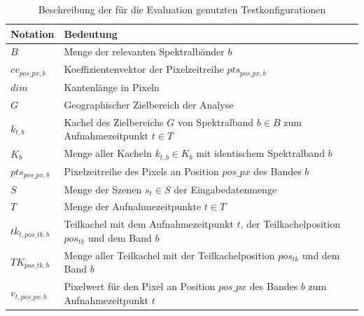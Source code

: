 \begin{table}[h]
          \centering
          \begin{tabular}{| p{2cm} | p{8cm} |}
          	\hline
                  Notation & Bedeutung \\
                  \hline
                  $B$ & Menge der relevanten Spektralbänder $b$ \\
                  \hline
                  $cv_{pos\_px, b}$ & Koeffizientenvektor der Pixelzeitreihe  $pts_{pos\_px, b}$ \\
                  \hline
                  $dim$ & Kantenlänge in Pixeln \\
                  \hline
                  $G$ & Geographischer Zielbereich der Analyse  \\
                  \hline
                  $k_{t, b}$ & Kachel des Zielbereichs $G$ von Spektralband $b \in B$ zum Aufnahmezeitpunkt $t \in T$  \\
                  \hline
                  $K_{b}$ & Menge aller Kacheln $k_{t, b} \in K_b$ mit identischem Spektralband $b$ \\
                  \hline
                  $pts_{pos\_px, b}$ & Pixelzeitreihe des Pixels an Position $pos\_px$ des Bandes $b$ \\
                  \hline
                  $S$ & Menge der Szenen $s_t \in S$ der Eingabedatenmenge \\
                  \hline
		$T$ & Menge der Aufnahmezeitpunkte $t \in T$ \\
                  \hline
                  $tk_{t, pos\_tk, b}$ & Teilkachel mit dem Aufnahmezeitpunkt $t$, der Teilkachelposition $pos_{tk}$ und dem Band $b$ \\
                  \hline
                  $TK_{pos\_tk, b}$ & Menge aller Teilkachel mit der Teilkachelposition $pos_{tk}$ und dem Band $b$ \\
                  \hline
		$v_{t, pos\_px, b}$ & Pixelwert für den Pixel an Position $pos\_px$ des Bandes $b$ zum Aufnahmezeitpunkt $t$ \\
                  \hline

          \end{tabular}
          \caption{Beschreibung der für die Evaluation genutzten Testkonfigurationen}
          \label{tab:descriptionTestSetting}
\end{table}

